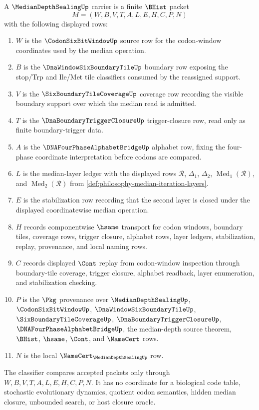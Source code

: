 \begin{definition}
\label{def:median-depth-sealing-carrier}
A $\MedianDepthSealingUp$ carrier is a finite $\BHist$ packet
$$
M=(W,B,V,T,A,L,E,H,C,P,N)
$$
with the following displayed rows:
\begin{enumerate}
\item $W$ is the $\CodonSixBitWindowUp$ source row for the codon-window coordinates used by the median operation.
\item $B$ is the $\DnaWindowSixBoundaryTileUp$ boundary row exposing the stop/Trp and Ile/Met tile classifiers consumed by the reassigned support.
\item $V$ is the $\SixBoundaryTileCoverageUp$ coverage row recording the visible boundary support over which the median read is admitted.
\item $T$ is the $\DnaBoundaryTriggerClosureUp$ trigger-closure row, read only as finite boundary-trigger data.
\item $A$ is the $\DNAFourPhaseAlphabetBridgeUp$ alphabet row, fixing the four-phase coordinate interpretation before codons are compared.
\item $L$ is the median-layer ledger with the displayed rows $\mathcal{R}$, $\Delta_{1}$, $\Delta_{2}$, $\operatorname{Med}_{1}(\mathcal{R})$, and $\operatorname{Med}_{2}(\mathcal{R})$ from \autoref{def:philosophy-median-iteration-layers}.
\item $E$ is the stabilization row recording that the second layer is closed under the displayed coordinatewise median operation.
\item $H$ records componentwise $\hsame$ transport for codon windows, boundary tiles, coverage rows, trigger closure, alphabet rows, layer ledgers, stabilization, replay, provenance, and local naming rows.
\item $C$ records displayed $\Cont$ replay from codon-window inspection through boundary-tile coverage, trigger closure, alphabet readback, layer enumeration, and stabilization checking.
\item $P$ is the $\Pkg$ provenance over $\MedianDepthSealingUp$, $\CodonSixBitWindowUp$, $\DnaWindowSixBoundaryTileUp$, $\SixBoundaryTileCoverageUp$, $\DnaBoundaryTriggerClosureUp$, $\DNAFourPhaseAlphabetBridgeUp$, the median-depth source theorem, $\BHist$, $\hsame$, $\Cont$, and $\NameCert$ rows.
\item $N$ is the local $\NameCert_{\MedianDepthSealingUp}$ row.
\end{enumerate}
The classifier compares accepted packets only through $W,B,V,T,A,L,E,H,C,P,N$. It has no coordinate for a biological code table, stochastic evolutionary dynamics, quotient codon semantics, hidden median closure, unbounded search, or host closure oracle.
\end{definition}

